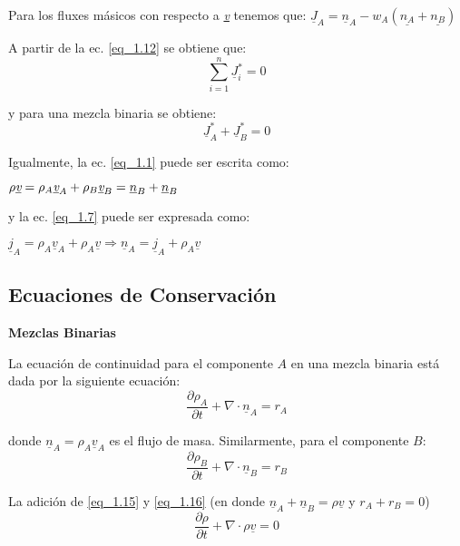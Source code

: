  Para los fluxes másicos con respecto a \underline{\emph{v}} tenemos que: $\underline{J}_A=\underline{n}_A-w_A (\underline{n_A}+\underline{n_B})$

 A partir de la ec. \ref{eq_1.12} se obtiene que:
 \begin{equation}
 	\sum_{i=1}^n \underline{J}_i^* =0 \tag{1.13}\label{eq_1.13}
 \end{equation}
 
 y para una mezcla binaria se obtiene:
 \begin{equation}
 	\underline{J}_A^* + \underline{J}_B^* = 0 \tag{1.14}\label{eq_1.14}
 \end{equation}
 
 Igualmente, la ec. \ref{eq_1.1} puede ser escrita como:	
 
$\rho \underline{\emph{v}}=\rho_A \underline{\emph{v}}_A+\rho_B \underline{\emph{v}}_B=\underline{n}_B+\underline{n}_B$
 
 y la ec. \ref{eq_1.7} puede ser expresada como:
 
 $ \underline{j}_A=	\rho_A \underline{v}_A + \rho_A \underline{v} \Rightarrow \underline{n}_A = \underline{j}_A + \rho_A \underline{v} $
 
 \subsection{Ecuaciones de Conservación}
 \textbf{Mezclas Binarias}
 
 La ecuación de continuidad para el componente $A$ en una mezcla binaria está dada por la siguiente ecuación:
 \begin{equation}
 	\frac{\partial \rho_A}{\partial t} + \nabla \cdot \underline{n}_A = r_A \tag{1.15}\label{eq_1.15}
 \end{equation}
 
 donde $\underline{n}_A=\rho_A \underline{v}_A$ es el flujo de masa.		 Similarmente, para el componente $B$:
 \begin{equation}
 	\frac{\partial \rho_B}{\partial t} + \nabla \cdot \underline{n}_B = r_B \tag{1.16}\label{eq_1.16}
 \end{equation}
 
 La adición de \ref{eq_1.15} y \ref{eq_1.16} (en donde  $\underline{n}_A + \underline{n}_B = \rho \underline{v}$ y $r_A + r_B = 0$)
 \begin{equation}
 	\frac{\partial \rho}{\partial t} + \nabla \cdot \rho \underline{v} = 0 \tag{1.17} \label{eq_1.17}
 \end{equation}
 
